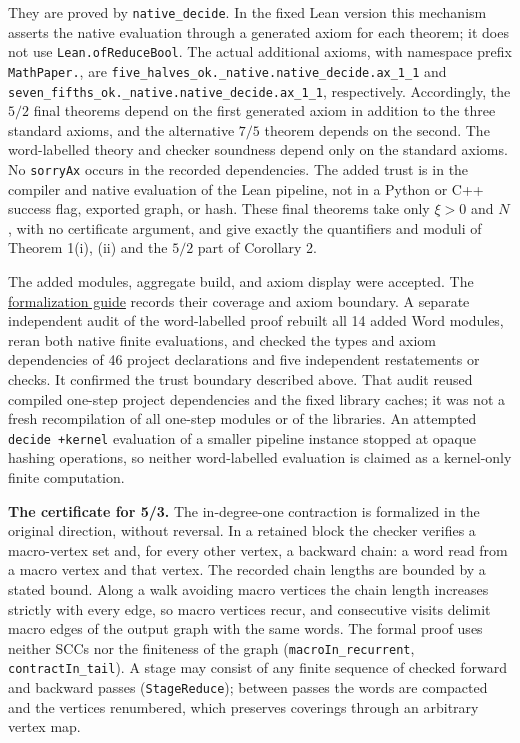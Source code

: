 \documentclass[11pt,reqno]{amsart}
\theoremstyle{definition}
\theoremstyle{remark}
\begin{document}
They are proved by \nolinkurl{native_decide}. In the fixed Lean version this
mechanism asserts the native evaluation through a generated axiom for
each theorem; it does not use \texttt{Lean.ofReduceBool}. The actual additional
axioms, with namespace prefix \texttt{MathPaper.}, are
\nolinkurl{five_halves_ok._native.native_decide.ax_1_1} and
\nolinkurl{seven_fifths_ok._native.native_decide.ax_1_1}, respectively. Accordingly,
the \(5/2\) final theorems depend on the first generated axiom in
addition to the three standard axioms, and the alternative \(7/5\)
theorem depends on the second. The word-labelled theory and checker
soundness depend only on the standard axioms. No \texttt{sorryAx} occurs in
the recorded dependencies. The added trust is in the compiler and native
evaluation of the Lean pipeline, not in a Python or C++ success flag,
exported graph, or hash. These final theorems take only \(\xi>0\) and
\(N\), with no certificate argument, and give exactly the quantifiers
and moduli of Theorem 1(i), (ii) and the \(5/2\) part of Corollary 2.

The added modules, aggregate build, and axiom display were accepted.
The \href{supplement/FORMALIZATION.md}{formalization guide} records their coverage and axiom boundary. A separate
independent audit of the word-labelled proof rebuilt all 14 added Word modules, reran both native finite evaluations,
and checked the types and axiom dependencies of 46 project declarations
and five independent restatements or checks. It confirmed the trust
boundary described above. That audit reused compiled one-step
project dependencies and the fixed library caches; it was not a fresh
recompilation of all one-step modules or of the libraries.
An attempted \texttt{decide\ +kernel}
evaluation of a smaller pipeline instance stopped at opaque hashing
operations, so neither word-labelled evaluation is claimed as a
kernel-only finite computation.

\textbf{The certificate for 5/3.} The in-degree-one contraction is
formalized in the original direction, without reversal. In a retained block
the checker verifies a macro-vertex set and, for every other vertex, a
backward chain: a word read from a macro vertex and that vertex. The recorded
chain lengths are bounded by a stated bound. Along a walk avoiding macro
vertices the chain length increases strictly with every edge, so macro vertices
recur, and consecutive visits delimit macro edges of the output graph with the
same words. The formal proof uses neither SCCs nor the finiteness of the graph
(\nolinkurl{macroIn_recurrent}, \nolinkurl{contractIn_tail}). A stage may consist
of any finite sequence of checked forward and backward passes
(\nolinkurl{StageReduce}); between passes the words are compacted and the vertices
renumbered, which preserves coverings through an arbitrary vertex map.
\end{document}
